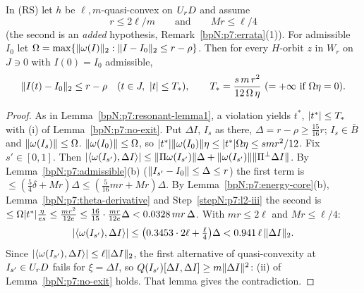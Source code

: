 \begin{lemma}\label{bpN:p7:resonant-lemma2}
In (RS) let $h$ be $\ell,m$-quasi-convex on $U_{r}D$ and assume
\[r\le2\ell/m\qquad\text{and}\qquad Mr\le\ell/4\tag{R}\]
(the second is an \emph{added} hypothesis, Remark~\ref{bpN:p7:errata}(1)). For admissible $I_0$ let $\Omega=\max\{\lVert \omega(I)\rVert_2:\lVert I-I_0\rVert_2\le r-\rho\}$. Then for every $H$-orbit $z$ in $W_r$ on $J\ni0$ with $I(0)=I_0$ admissible,
\[\lVert I(t)-I_0\rVert_2\le r-\rho\quad(t\in J,\ \lvert t\rvert\le T_*),\qquad T_*=\frac{s\,m\,r^2}{12\,\Omega\,\eta}\ (=+\infty\text{ if }\Omega\eta=0).\]
\end{lemma}
\begin{proof}
\label{stepN:p7:l2-exit} As in Lemma~\ref{bpN:p7:resonant-lemma1}, a violation yields $t^*$, $\lvert t^*\rvert\le T_*$ with (i) of Lemma~\ref{bpN:p7:no-exit}. Put $\Delta I$, $I_s$ as there, $\Delta=r-\rho\ge\frac{15}{16}r$; $I_s\in\bar B$ and $\lVert \omega(I_s)\rVert\le\Omega$.
\label{stepN:p7:l2-iii} $\lVert \omega(I_0)\rVert\le\Omega$, so $\lvert t^*\rvert\lVert \omega(I_0)\rVert\eta\le\lvert t^*\rvert\Omega\eta\le smr^2/12$.
\label{stepN:p7:l2-cone} Fix $s'\in[0,1]$. Then $\lvert \langle \omega(I_{s'}),\Delta I\rangle\rvert\le\lVert \Pi\omega(I_{s'})\rVert\Delta+\lVert \omega(I_{s'})\rVert\lVert \Pi^\perp\Delta I\rVert$. By Lemma~\ref{bpN:p7:admissible}(b) ($\lVert I_{s'}-I_0\rVert\le\Delta\le r$) the first term is $\le(\frac54\delta+Mr)\Delta\le(\frac5{16}mr+Mr)\Delta$. By Lemma~\ref{bpN:p7:energy-core}(b), Lemma~\ref{bpN:p7:theta-derivative} and Step~\ref{stepN:p7:l2-iii} the second is $\le\Omega\lvert t^*\rvert\frac\eta{es}\le\frac{mr^2}{12e}\le\frac{16}{15}\cdot\frac{mr}{12e}\Delta<0.0328\,mr\,\Delta$. With $mr\le2\ell$ and $Mr\le\ell/4$:
\[\lvert \langle \omega(I_{s'}),\Delta I\rangle\rvert\le\bigl(0.3453\cdot2\ell+\tfrac\ell4\bigr)\Delta<0.941\,\ell\,\lVert \Delta I\rVert_2 .\]
\label{stepN:p7:l2-conv} Since $\lvert \langle \omega(I_{s'}),\Delta I\rangle\rvert\le\ell\lVert \Delta I\rVert_2$, the first alternative of quasi-convexity at $I_{s'}\in U_{r}D$ fails for $\xi=\Delta I$, so $Q(I_{s'})[\Delta I,\Delta I]\ge m\lVert \Delta I\rVert^2$: (ii) of Lemma~\ref{bpN:p7:no-exit} holds. That lemma gives the contradiction.
\end{proof}

